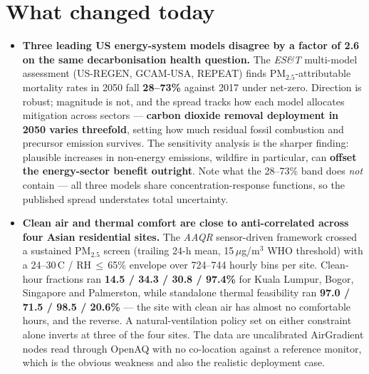 \documentclass[10pt]{article}
\begin{document}
\clearpage

\section*{\sffamily\bfseries\color{Deep}What changed today}
\vspace{-1.5mm}{\color{Amber}\rule{\linewidth}{1.1pt}}\vspace{2.5mm}

\footnotesize
\begin{itemize}
\item \textbf{Three leading US energy-system models disagree by a factor of 2.6 on the same
decarbonisation health question.} The \textit{ES\&T} multi-model assessment (US-REGEN,
GCAM-USA, REPEAT) finds PM$_{2.5}$-attributable mortality rates in 2050 fall
\textbf{28--73\%} against 2017 under net-zero. Direction is robust; magnitude is not, and
the spread tracks how each model allocates mitigation across sectors --- \textbf{carbon
dioxide removal deployment in 2050 varies threefold}, setting how much residual fossil
combustion and precursor emission survives. The sensitivity analysis is the sharper
finding: plausible increases in non-energy emissions, wildfire in particular, can
\textbf{offset the energy-sector benefit outright}. Note what the 28--73\% band does
\emph{not} contain --- all three models share concentration-response functions, so the
published spread understates total uncertainty.

\item \textbf{Clean air and thermal comfort are close to anti-correlated across four Asian
residential sites.} The \textit{AAQR} sensor-driven framework crossed a sustained
PM$_{2.5}$ screen (trailing 24-h mean, 15\,$\mu$g/m$^3$ WHO threshold) with a 24--30\,\textdegree C
/ RH\,$\le$\,65\% envelope over 724--744 hourly bins per site. Clean-hour fractions ran
\textbf{14.5 / 34.3 / 30.8 / 97.4\%} for Kuala Lumpur, Bogor, Singapore and Palmerston,
while standalone thermal feasibility ran \textbf{97.0 / 71.5 / 98.5 / 20.6\%} --- the site
with clean air has almost no comfortable hours, and the reverse. A natural-ventilation
policy set on either constraint alone inverts at three of the four sites. The data are
uncalibrated AirGradient nodes read through OpenAQ with no co-location against a reference
monitor, which is the obvious weakness and also the realistic deployment case.


\end{itemize}
\end{document}
